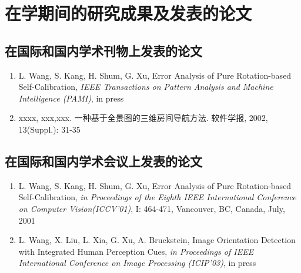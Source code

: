 



\chapter*{在学期间的研究成果及发表的论文}

\section*{在国际和国内学术刊物上发表的论文}

\renewcommand{\labelenumi}{[\arabic{enumi}]}

\begin{enumerate}

\item L. Wang, S. Kang, H. Shum, G. Xu, Error Analysis of Pure
Rotation-based Self-Calibration, {\em{IEEE Transactions on Pattern
Analysis and Machine Intelligence (PAMI)}}, in press

\item xxxx, xxx,xxx. 一种基于全景图的三维房间导航方法.
软件学报, 2002, 13(Suppl.): 31-35

\end{enumerate}

\section*{在国际和国内学术会议上发表的论文}

\begin{enumerate}

\item L. Wang, S. Kang, H. Shum, G. Xu, Error Analysis of Pure
Rotation-based Self-Calibration, {\em{in Proceedings of the Eighth
IEEE International Conference on Computer Vision(ICCV'01)}}, I:
464-471, Vancouver, BC, Canada, July, 2001

\item L. Wang, X. Liu, L. Xia, G. Xu, A. Bruckstein, Image
Orientation Detection with Integrated Human Perception Cues,
{\em{in Proceedings of IEEE International Conference on Image
Processing (ICIP'03)}}, in press

\end{enumerate}
